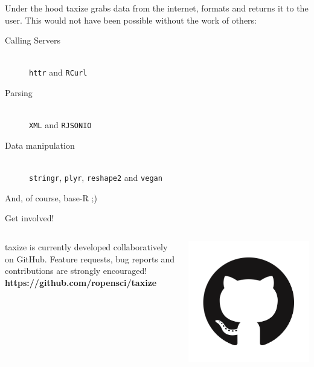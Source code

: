 \documentclass[final,t]{beamer}\usepackage[]{graphicx}\usepackage[]{color}
\begin{document}
\begin{frame}[fragile]
\begin{columns}[t]
\begin{column}{.485\linewidth}
      \begin{block}{Under the hood}
      taxize grabs data from the internet, formats and returns it to the user.
      This would not have been possible without the work of others:
      \begin{description}
        \item[Calling Servers] \hfill \\
          \texttt{httr} and \texttt{RCurl}
        \item[Parsing] \hfill \\
          \texttt{XML} and \texttt{RJSONIO}
        \item[Data manipulation] \hfill \\
          \texttt{stringr}, \texttt{plyr}, \texttt{reshape2} and \texttt{vegan}
      \end{description}
      \vspace{0.5cm}
      And, of course, base-R ;)
      
      \end{block}
      
			\begin{block}{Get involved!}
				\begin{columns}[T]
					\begin{column}{.85\linewidth}
						taxize is currently developed collaboratively on GitHub. Feature requests, bug reports and contributions are strongly encouraged! \\[0.5em]
						\huge \Mundus \normalsize \hspace{0.5cm} \textbf{https://github.com/ropensci/taxize}
					\end{column}
					\begin{column}{.13\linewidth}
						\includegraphics[width=0.9\linewidth]{fig/github.png}
					\end{column}
				\end{columns}
			\end{block}
      

\end{column}
\end{columns}
\end{frame}
\end{document}
